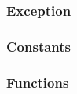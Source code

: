 \documentclass{jbook}
\makeatletter
\newcommand{\txt}[2]{#2}
\newcommand{\code}[1]{\mbox{\large\tt #1}}
\newcommand{\br}{\\}
\newcommand{\DECL}[2]{
 \medskip\noindent
 {\tt #1\begin{tabular}[t]{@{}l@{}l}#2\end{tabular}\par}
}
\newcommand{\val}[2]{\code{val~#1~:~#2}\par}
\newcommand{\exception}[1]{\DECL{exception~#1}{}}
\newcommand{\exceptionWithArg}[2]{\DECL{exception~#1~of~}{#2}}
\newcommand{\Exceptions}{\subsubsection*{\txt{例外}{Exception}}}
\newcommand{\Constants}{\subsubsection*{\txt{定数}{Constants}}}
\newcommand{\Functions}{\subsubsection*{\txt{関数}{Functions}}}
\makeatother
\begin{document}
\Exceptions


\Constants


\Functions

\end{document}
